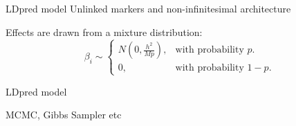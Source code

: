 \documentclass{beamer}
\begin{document}
%                
    
    
    \appendix
%        
%        
    
    \begin{frame}[t]{LDpred model}
    Unlinked markers and non-infinitesimal architecture\\
    \newline
    
    Effects are drawn from a mixture distribution:
    \begin{equation}
 \beta_{i}\sim\begin{cases}
    N(0, \frac{h^2}{Mp}), & \text{with probability $p$}.\\
    0, & \text{with probability $1-p$}.
  \end{cases}
\end{equation}
        
        
    
    \end{frame}
    
       \begin{frame}{LDpred model}
       \end{frame}
       
       
       \begin{frame}{MCMC, Gibbs Sampler etc}
       \end{frame}
       
\end{document}
